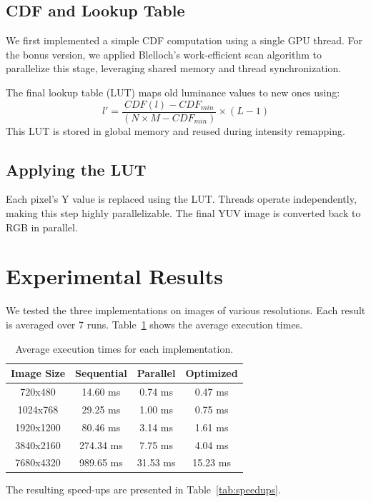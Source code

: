 \documentclass[9pt]{IEEEtran}
\begin{document}
\subsection{CDF and Lookup Table}
We first implemented a simple CDF computation using a single GPU thread. For the bonus version, we applied Blelloch’s work-efficient scan algorithm to parallelize this stage, leveraging shared memory and thread synchronization.

The final lookup table (LUT) maps old luminance values to new ones using:
\[
l' = \frac{CDF(l) - CDF_{min}}{(N \times M - CDF_{min})} \times (L - 1)
\]
This LUT is stored in global memory and reused during intensity remapping.

\subsection{Applying the LUT}
Each pixel’s Y value is replaced using the LUT. Threads operate independently, making this step highly parallelizable. The final YUV image is converted back to RGB in parallel.

\section{Experimental Results}
We tested the three implementations on images of various resolutions. Each result is averaged over 7 runs. Table~\ref{tab:avg_times} shows the average execution times.

\begin{table}[H]
\centering
\begin{tabular}{|c|c|c|c|}
\hline
Image Size & Sequential & Parallel & Optimized \\ \hline
720x480   & 14.60 ms  & 0.74 ms  & 0.47 ms  \\ \hline
1024x768  & 29.25 ms  & 1.00 ms  & 0.75 ms  \\ \hline
1920x1200 & 80.46 ms  & 3.14 ms  & 1.61 ms  \\ \hline
3840x2160 & 274.34 ms & 7.75 ms  & 4.04 ms  \\ \hline
7680x4320 & 989.65 ms & 31.53 ms & 15.23 ms \\ \hline
\end{tabular}
\caption{Average execution times for each implementation.}
\label{tab:avg_times}
\end{table}

The resulting speed-ups are presented in Table~\ref{tab:speedups}.
\end{document}
